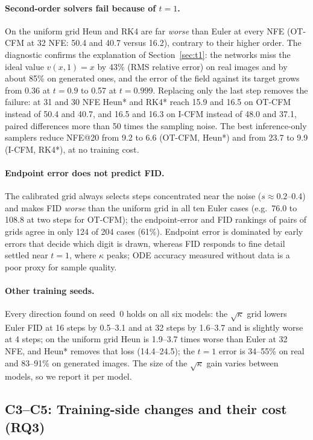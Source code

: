 \paragraph{Second-order solvers fail because of $t=1$.} On the uniform grid Heun and RK4 are far \emph{worse} than Euler at every NFE (OT-CFM at 32 NFE: 50.4 and 40.7 versus 16.2), contrary to their higher order. The diagnostic confirms the explanation of Section~\ref{sec:t1}: the networks miss the ideal value $v(x,1)=x$ by 43\% (RMS relative error) on real images and by about 85\% on generated ones, and the error of the field against its target grows from 0.36 at $t=0.9$ to 0.57 at $t=0.999$. Replacing only the last step removes the failure: at 31 and 30 NFE Heun* and RK4* reach 15.9 and 16.5 on OT-CFM instead of 50.4 and 40.7, and 16.5 and 16.3 on I-CFM instead of 48.0 and 37.1, paired differences more than 50 times the sampling noise. The best inference-only samplers reduce NFE@20 from 9.2 to 6.6 (OT-CFM, Heun*) and from 23.7 to 9.9 (I-CFM, RK4*), at no training cost. %
\paragraph{Endpoint error does not predict FID.} The calibrated grid always selects steps concentrated near the noise ($s\approx0.2$--0.4) and makes FID \emph{worse} than the uniform grid in all ten Euler cases (e.g.\ 76.0 to 108.8 at two steps for OT-CFM); the endpoint-error and FID rankings of pairs of grids agree in only 124 of 204 cases (61\%). Endpoint error is dominated by early errors that decide which digit is drawn, whereas FID responds to fine detail settled near $t=1$, where $\kappa$ peaks; ODE accuracy measured without data is a poor proxy for sample quality.
\paragraph{Other training seeds.} Every direction found on seed~0 holds on all six models: the $\sqrt\kappa$ grid lowers Euler FID at 16 steps by 0.5--3.1 and at 32 steps by 1.6--3.7 and is slightly worse at 4 steps; on the uniform grid Heun is 1.9--3.7 times worse than Euler at 32 NFE, and Heun* removes that loss (14.4--24.5); the $t=1$ error is 34--55\% on real and 83--91\% on generated images. The size of the $\sqrt\kappa$ gain varies between models, so we report it per model.

\subsection{C3--C5: Training-side changes and their cost (RQ3)}\label{sec:c35}
